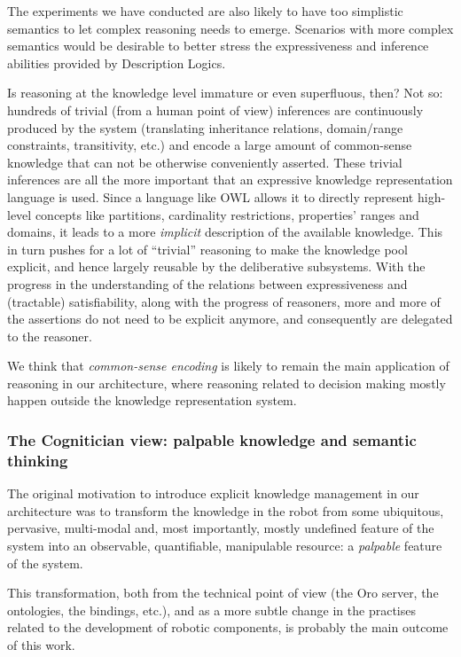 \documentclass[letterpaper, 10 pt, conference]{ieeeconf}  %
\begin{document}
The experiments we have conducted are also likely to have too simplistic
semantics to let complex reasoning needs to emerge. Scenarios with more complex
semantics would be desirable to better stress the expressiveness and inference
abilities provided by Description Logics.

Is reasoning at the knowledge level immature or even superfluous, then? Not so:
hundreds of trivial (from a human point of view) inferences are continuously
produced by the system (translating inheritance relations, domain/range
constraints, transitivity, etc.) and encode a large amount of common-sense
knowledge that can not be otherwise conveniently asserted. These trivial
inferences are all the more important that an expressive knowledge
representation language is used. Since a language like OWL allows it to
directly represent high-level concepts like partitions, cardinality
restrictions, properties' ranges and domains, it leads to a more
\emph{implicit} description of the available knowledge.  This in turn pushes
for a lot of ``trivial'' reasoning to make the knowledge pool explicit, and
hence largely reusable by the deliberative subsystems. With the progress in the
understanding of the relations between expressiveness and (tractable)
satisfiability, along with the progress of reasoners, more and more of the
assertions do not need to be explicit anymore, and consequently are delegated
to the reasoner.

We think that \emph{common-sense encoding} is likely to remain the main
application of reasoning in our architecture, where reasoning related
to decision making mostly happen outside the knowledge representation system.


\subsubsection{The Cognitician view: palpable knowledge and semantic thinking}

The original motivation to introduce explicit knowledge management in our
architecture was to transform the knowledge in the robot from some ubiquitous,
pervasive, multi-modal and, most importantly, mostly undefined feature of the
system into an observable, quantifiable, manipulable resource: a
\emph{palpable} feature of the system.

This transformation, both from the technical point of view (the {\sc Oro}
server, the ontologies, the bindings, etc.), and as a more subtle change in the
practises related to the development of robotic components, is probably the
main outcome of this work.
\end{document}
